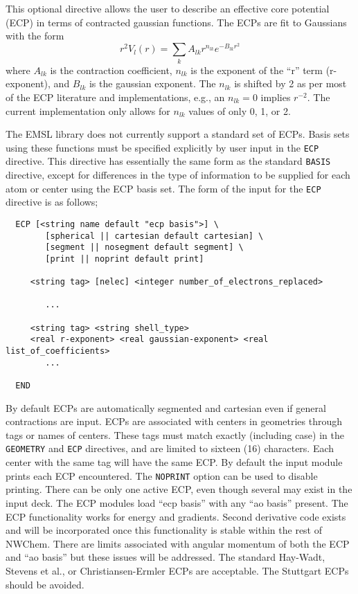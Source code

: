 \label{sec:ecp}

This optional directive allows the user to describe an effective core
potential (ECP) in terms of contracted gaussian functions.  The ECPs
are fit to Gaussians with the form
\[
 r^2V_l(r) = \sum_{k} A_{lk} r^{n_{lk}} e^{-B_{lk}r^{2}}
\]
where $A_{lk}$ is the contraction coefficient, $n_{lk}$ is the
exponent of the ``r'' term (r-exponent), and $B_{lk}$ is the gaussian
exponent.  The $n_{lk}$ is shifted by 2 as per most of the ECP
literature and implementations, e.g., an $n_{lk} = 0$ implies
$r^{-2}$.  The current implementation only allows for $n_{lk}$ values
of only 0, 1, or 2. 

The EMSL library does not currently support a standard set of ECPs.
Basis sets using these functions must be specified explicitly by user
input in the \verb+ECP+ directive.  This directive has essentially the
same form as the standard \verb+BASIS+ directive, except for
differences in the type of information to be supplied for each atom or
center using the ECP basis set.  The form of the input for the
\verb+ECP+ directive is as follows;

\begin{verbatim}
  ECP [<string name default "ecp basis">] \
        [spherical || cartesian default cartesian] \
        [segment || nosegment default segment] \
        [print || noprint default print]

     <string tag> [nelec] <integer number_of_electrons_replaced>
 
        ...

     <string tag> <string shell_type>
     <real r-exponent> <real gaussian-exponent> <real list_of_coefficients>
        ...
     
  END
\end{verbatim}    

By default ECPs are automatically segmented and cartesian even if
general contractions are input.  ECPs are associated with centers in
geometries through tags or names of centers.  These tags must match
exactly (including case) in the \verb+GEOMETRY+ and \verb+ECP+
directives, and are limited to sixteen (16) characters.  Each center
with the same tag will have the same ECP.  By default the input module
prints each ECP encountered.  The \verb+NOPRINT+ option can be used to
disable printing.  There can be only one active ECP, even though
several may exist in the input deck.  The ECP modules load ``ecp
basis'' with any ``ao basis'' present.  The ECP functionality works
for energy and gradients.  Second derivative code exists and will be
incorporated once this functionality is stable within the rest of
NWChem.  There are limits associated with angular momentum of both the
ECP and ``ao basis'' but these issues will be addressed. The standard
Hay-Wadt, Stevens et al., or Christiansen-Ermler ECPs are acceptable.
The Stuttgart ECPs should be avoided.

